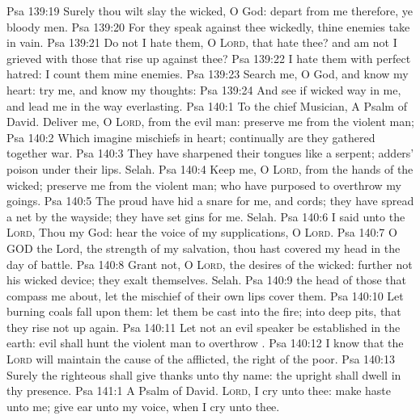 \vs Psa 139:19 Surely thou wilt slay the wicked, O God: depart from me therefore, ye bloody men.
\vs Psa 139:20 For they speak against thee wickedly,  thine enemies take  in vain.
\vs Psa 139:21 Do not I hate them, O \textsc{Lord}, that hate thee? and am not I grieved with those that rise up against thee?
\vs Psa 139:22 I hate them with perfect hatred: I count them mine enemies.
\vs Psa 139:23 Search me, O God, and know my heart: try me, and know my thoughts:
\vs Psa 139:24 And see if  wicked way in me, and lead me in the way everlasting.
\vs Psa 140:1 To the chief Musician, A Psalm of David. Deliver me, O \textsc{Lord}, from the evil man: preserve me from the violent man;
\vs Psa 140:2 Which imagine mischiefs in  heart; continually are they gathered together  war.
\vs Psa 140:3 They have sharpened their tongues like a serpent; adders' poison  under their lips. Selah.
\vs Psa 140:4 Keep me, O \textsc{Lord}, from the hands of the wicked; preserve me from the violent man; who have purposed to overthrow my goings.
\vs Psa 140:5 The proud have hid a snare for me, and cords; they have spread a net by the wayside; they have set gins for me. Selah.
\vs Psa 140:6 I said unto the \textsc{Lord}, Thou  my God: hear the voice of my supplications, O \textsc{Lord}.
\vs Psa 140:7 O GOD the Lord, the strength of my salvation, thou hast covered my head in the day of battle.
\vs Psa 140:8 Grant not, O \textsc{Lord}, the desires of the wicked: further not his wicked device;  they exalt themselves. Selah.
\vs Psa 140:9  the head of those that compass me about, let the mischief of their own lips cover them.
\vs Psa 140:10 Let burning coals fall upon them: let them be cast into the fire; into deep pits, that they rise not up again.
\vs Psa 140:11 Let not an evil speaker be established in the earth: evil shall hunt the violent man to overthrow .
\vs Psa 140:12 I know that the \textsc{Lord} will maintain the cause of the afflicted,  the right of the poor.
\vs Psa 140:13 Surely the righteous shall give thanks unto thy name: the upright shall dwell in thy presence.
\vs Psa 141:1 A Psalm of David. \textsc{Lord}, I cry unto thee: make haste unto me; give ear unto my voice, when I cry unto thee.

